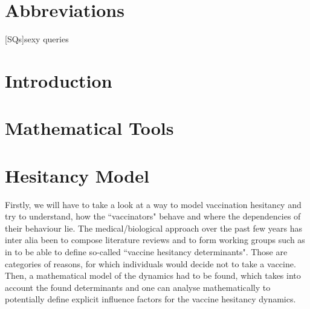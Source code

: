 \documentclass[12pt,a4paper,twoside]{article}
\begin{document}
\newpage
\tableofcontents
\newpage

\pagestyle{headings}

\newpage


\section*{Abbreviations}
\begin{acronym}[KPMG]%
	[SQs]{sexy queries}
\end{acronym}

\section{Introduction}
%	

\section{Mathematical Tools}

\section{Hesitancy Model}
Firstly, we will have to take a look at a way to model vaccination hesitancy and try to understand, how the ``vaccinators" behave and where the dependencies of their behaviour lie. The medical/biological approach over the past few years has inter alia been to compose literature reviews and to form working groups such as in \cite{MacDonald2015} to be able to define so-called ``vaccine hesitancy determinants". Those are categories of reasons, for which individuals would decide not to take a vaccine. Then, a mathematical model of the dynamics had to be found, which takes into account the found determinants and one can analyse mathematically to potentially define explicit influence factors for the vaccine hesitancy dynamics. 
\end{document}
